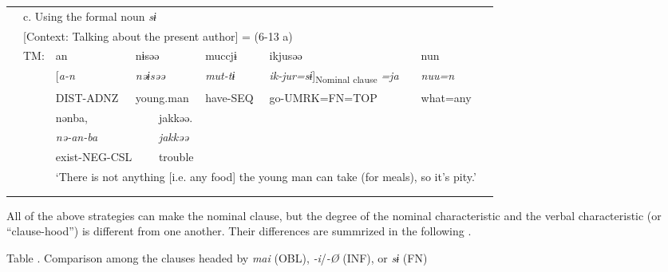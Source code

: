 \begin{tabularx}{\textwidth}{XXXXXXXXXXXXXXX}
& \multicolumn{13}{X}{{ c. Using the formal noun \textit{sɨ}}} & \\
& \multicolumn{13}{X}{{ [Context: Talking about the present author] = (6-13 a)}} & \\
& { TM:} & \multicolumn{3}{X}{{ an}} & \multicolumn{3}{X}{{ nɨsəə}} & \multicolumn{3}{X}{{ muccjɨ}} & \multicolumn{2}{X}{{ ikjusəə}} & { nun} & \\
&  & \multicolumn{3}{X}{{ [\textit{a-n}}} & \multicolumn{3}{X}{{\itshape nəɨsəə}} & \multicolumn{3}{X}{{\itshape mut-tɨ}} & \multicolumn{2}{X}{{ \textit{ik-jur=sɨ}]\textsubscript{Nominal clause} \textit{=ja}}} & {\itshape nuu=n} & \\
&  & \multicolumn{3}{X}{{ DIST-ADNZ}} & \multicolumn{3}{X}{{ young.man}} & \multicolumn{3}{X}{{ have-SEQ}} & \multicolumn{2}{X}{{ go-UMRK=FN=TOP}} & { what=any} & \\
&  & \multicolumn{4}{X}{{ nənba,}} & \multicolumn{8}{X}{{ jakkəə.}} & \\
&  & \multicolumn{4}{X}{{\itshape nə-an-ba}} & \multicolumn{8}{X}{{\itshape jakkəə}} & \\
&  & \multicolumn{4}{X}{{ exist-NEG-CSL}} & \multicolumn{8}{X}{{ trouble}} & \\
&  & \multicolumn{12}{X}{‘There is not anything [i.e. any food] the young man can take (for meals), so it’s pity.’} & \\
&  & \multicolumn{12}{X}{\raggedleft [Co: 101023\_01.txt]} & \\
\lspbottomrule
\end{tabularx}
All of the above strategies can make the nominal clause, but the degree of the nominal characteristic and the verbal characteristic (or “clause-hood”) is different from one another. Their differences are summrized in the following .

\begin{styleqwertya}
\label{bkm:Ref365475191}\hypertarget{RefHeadingToc395697367}{}\textmd{Table }\textmd{. Comparison among the clauses headed by} \textmd{\textit{mai}}\textmd{ (OBL),} \textmd{\textit{{}-i}}\textmd{/}\textmd{\textit{{}-Ø}}\textmd{ (INF), or} \textmd{\textit{sɨ}} (FN)
\end{styleqwertya}

\tablefirsthead{}

